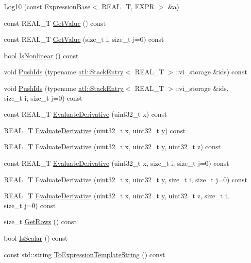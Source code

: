 \begin{DoxyCompactItemize}
\item 
\hyperlink{structatl_1_1_log10_a179bd24f45cb40d8c4c69b399d9ab006}{Log10} (const \hyperlink{structatl_1_1_expression_base}{Expression\+Base}$<$ R\+E\+A\+L\+\_\+\+T, E\+X\+P\+R $>$ \&a)
\item 
const R\+E\+A\+L\+\_\+\+T \hyperlink{structatl_1_1_log10_a4ef8c45dadaf5851b95dad741f797744}{Get\+Value} () const 
\item 
const R\+E\+A\+L\+\_\+\+T \hyperlink{structatl_1_1_log10_af6ddeb7607474a178aef69daf1cecc6d}{Get\+Value} (size\+\_\+t i, size\+\_\+t j=0) const 
\item 
bool \hyperlink{structatl_1_1_log10_a35042523fd50670b38c932f65f165660}{Is\+Nonlinear} () const 
\item 
void \hyperlink{structatl_1_1_log10_ada7fc1f52b2b6f91260e01835c368158}{Push\+Ids} (typename \hyperlink{structatl_1_1_stack_entry}{atl\+::\+Stack\+Entry}$<$ R\+E\+A\+L\+\_\+\+T $>$\+::vi\+\_\+storage \&ids) const 
\item 
void \hyperlink{structatl_1_1_log10_afa4734b1fa8a2f019607387bd9c397c2}{Push\+Ids} (typename \hyperlink{structatl_1_1_stack_entry}{atl\+::\+Stack\+Entry}$<$ R\+E\+A\+L\+\_\+\+T $>$\+::vi\+\_\+storage \&ids, size\+\_\+t i, size\+\_\+t j=0) const 
\item 
const R\+E\+A\+L\+\_\+\+T \hyperlink{structatl_1_1_log10_a1a8d53a7ee75d5b4e7e23821df097bf3}{Evaluate\+Derivative} (uint32\+\_\+t x) const 
\item 
R\+E\+A\+L\+\_\+\+T \hyperlink{structatl_1_1_log10_a2551cc893bd6d4e0bb4c3e8da3767696}{Evaluate\+Derivative} (uint32\+\_\+t x, uint32\+\_\+t y) const 
\item 
R\+E\+A\+L\+\_\+\+T \hyperlink{structatl_1_1_log10_aac9a5699adc29f8abb687400f6b1781f}{Evaluate\+Derivative} (uint32\+\_\+t x, uint32\+\_\+t y, uint32\+\_\+t z) const 
\item 
const R\+E\+A\+L\+\_\+\+T \hyperlink{structatl_1_1_log10_ae24fe26a0bbed5c9099ce91cec6e0252}{Evaluate\+Derivative} (uint32\+\_\+t x, size\+\_\+t i, size\+\_\+t j=0) const 
\item 
R\+E\+A\+L\+\_\+\+T \hyperlink{structatl_1_1_log10_a4f85bc4ecebbc205a5784ae1a67f574c}{Evaluate\+Derivative} (uint32\+\_\+t x, uint32\+\_\+t y, size\+\_\+t i, size\+\_\+t j=0) const 
\item 
R\+E\+A\+L\+\_\+\+T \hyperlink{structatl_1_1_log10_aa026f9fc6efae054e531442c61207951}{Evaluate\+Derivative} (uint32\+\_\+t x, uint32\+\_\+t y, uint32\+\_\+t z, size\+\_\+t i, size\+\_\+t j=0) const 
\item 
size\+\_\+t \hyperlink{structatl_1_1_log10_ac84945c7c8f62c7333cbda7b9044bfc4}{Get\+Rows} () const 
\item 
bool \hyperlink{structatl_1_1_log10_afc6637bc3430acc84043298ff4f084ba}{Is\+Scalar} () const 
\item 
const std\+::string \hyperlink{structatl_1_1_log10_a220c67729ae6c659e824378a97d110d6}{To\+Expression\+Template\+String} () const 
\end{DoxyCompactItemize}
